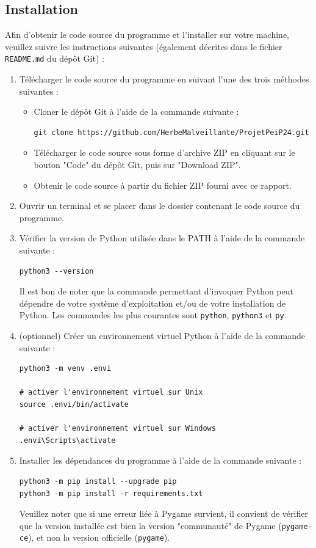 \documentclass[12pt]{scrreprt} %
\begin{document}
\subsection*{Installation}

Afin d'obtenir le code source du programme et l'installer sur votre machine, veuillez suivre les instructions suivantes (également décrites dans le fichier \texttt{README.md} du dépôt Git) :

\begin{enumerate}
    \item Télécharger le code source du programme en suivant l'une des trois méthodes suivantes :
          \begin{itemize}
              \item Cloner le dépôt Git à l'aide de la commande suivante :
                    \begin{verbatim}
git clone https://github.com/HerbeMalveillante/ProjetPeiP24.git      
              \end{verbatim}
              \item Télécharger le code source sous forme d'archive ZIP en cliquant sur le bouton "Code" du dépôt Git, puis sur "Download ZIP".
              \item Obtenir le code source à partir du fichier ZIP fourni avec ce rapport.
          \end{itemize}
    \item Ouvrir un terminal et se placer dans le dossier contenant le code source du programme.
    \item Vérifier la version de Python utilisée dans le PATH à l'aide de la commande suivante :
          \begin{verbatim}
python3 --version
    \end{verbatim}
          Il est bon de noter que la commande permettant d'invoquer Python peut dépendre de votre système d'exploitation et/ou de votre installation de Python. Les commandes les plus courantes sont \texttt{python}, \texttt{python3} et \texttt{py}.
    \item (optionnel) Créer un environnement virtuel Python à l'aide de la commande suivante :
          \begin{verbatim}
python3 -m venv .envi

# activer l'environnement virtuel sur Unix
source .envi/bin/activate

# activer l'environnement virtuel sur Windows
.envi\Scripts\activate
    \end{verbatim}
    \item Installer les dépendances du programme à l'aide de la commande suivante :
          \begin{verbatim}
python3 -m pip install --upgrade pip
python3 -m pip install -r requirements.txt
    \end{verbatim}
          Veuillez noter que si une erreur liée à Pygame survient, il convient de vérifier que la version installée est bien la version "communauté" de Pygame (\texttt{pygame-ce}), et non la version officielle (\texttt{pygame}).


\end{enumerate}
\end{document}

